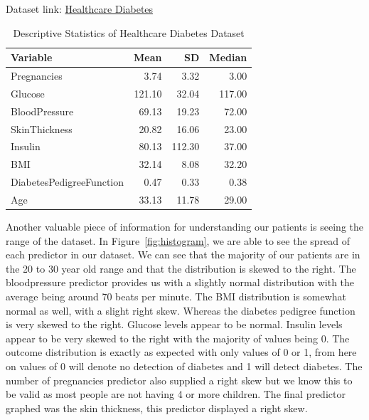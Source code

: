\documentclass[12pt]{article}
\begin{document}
Dataset link: \href{https://www.kaggle.com/datasets/nanditapore/healthcare-diabetes}{Healthcare Diabetes}

\begin{table}[ht]
    \caption{Descriptive Statistics of Healthcare Diabetes Dataset}
  \label{tab:ds}
\centering
\begin{tabular}{lrrr}
      \hline
    Variable & Mean & SD & Median \\ 
      \hline
      Pregnancies & 3.74 & 3.32 & 3.00 \\ 
      Glucose & 121.10 & 32.04 & 117.00 \\ 
      BloodPressure & 69.13 & 19.23 & 72.00 \\ 
      SkinThickness & 20.82 & 16.06 & 23.00 \\ 
      Insulin & 80.13 & 112.30 & 37.00 \\ 
      BMI & 32.14 & 8.08 & 32.20 \\ 
      DiabetesPedigreeFunction & 0.47 & 0.33 & 0.38 \\ 
      Age & 33.13 & 11.78 & 29.00 \\ 
       \hline
    \end{tabular}
    \end{table}

  Another valuable piece of information for understanding our patients is seeing the range of the dataset. In Figure~\ref{fig:histogram}, we
  are able to see the spread of each predictor in our dataset. We can see that the majority of our patients are in the 20 to 30 year old range and that the distribution is skewed to the right. 
  The bloodpressure predictor provides us with a slightly normal distribution with the average being around 70 beats per minute. The BMI
  distribution is somewhat normal as well, with a slight right skew. Whereas the diabetes pedigree function is very skewed to the right. Glucose
  levels appear to be normal. Insulin levels appear to be very skewed to the right with the majority of values being 0. The outcome distribution
  is exactly as expected with only values of 0 or 1, from here on values of 0 will denote no detection of diabetes and 1 will detect diabetes. The
  number of pregnancies predictor also supplied a right skew but we know this to be valid as most people are not having 4 or more children. The 
  final predictor graphed was the skin thickness, this predictor displayed a right skew.
\end{document}
